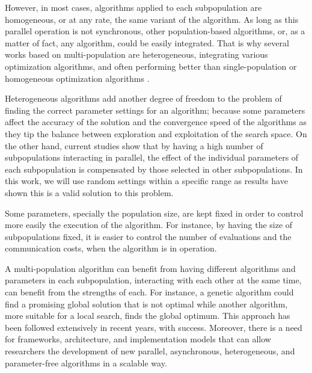 \documentclass[runningheads]{llncs}
\begin{document}
However, in most cases, algorithms applied to each subpopulation are
homogeneous, or at any rate, the same variant of the algorithm. As long as this
parallel operation is not synchronous, other population-based algorithms, or, as
a matter of fact, any algorithm, could be easily integrated. That is why several
works based on multi-population are heterogeneous, integrating various
optimization algorithms, and often performing better than single-population or
homogeneous optimization algorithms \cite{wu2016differential,nseef2016adaptive}.

Heterogeneous algorithms add another degree of freedom to the problem of finding
the correct parameter settings for an algorithm; because some parameters affect
the accuracy of the solution and the convergence speed of the algorithms as they
tip the balance between exploration and exploitation of the search space. On the
other hand, current studies show that by having a high number of subpopulations
interacting in parallel, the effect of the individual parameters of each
subpopulation is compensated by those selected in other subpopulations. In this
work, we will use random settings within a specific range as results have shown
this is a valid solution to this problem. 

Some parameters, specially the population size, are
kept fixed in order to control more easily the execution of the algorithm. For
instance, by having the size of subpopulations fixed, it is easier to control
the number of evaluations and the communication costs, when the algorithm is in
operation.

A multi-population algorithm can benefit from having different algorithms 
and parameters in each subpopulation, interacting with each
other at the same time, can benefit from the strengths of each. For instance, a
genetic algorithm could find a promising global solution that is not optimal
while another algorithm, more suitable for a local search, finds the global
optimum. This approach has been followed extensively in recent years, with
success. Moreover, there is a need for frameworks, architecture, and
implementation models that can allow researchers the development of new
parallel, asynchronous, heterogeneous, and parameter-free algorithms in a scalable way.  
\end{document}
